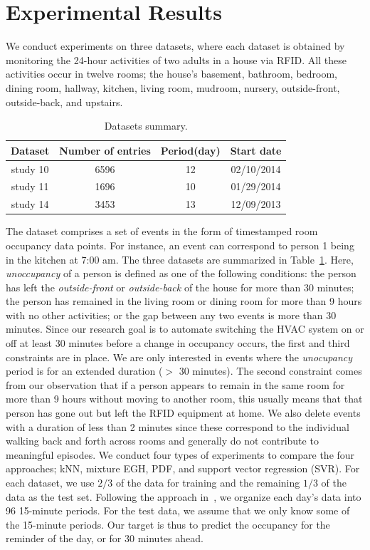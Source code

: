 \section{Experimental Results}
We conduct experiments on three datasets, where each dataset is obtained by monitoring the 24-hour activities of two adults in a house via RFID. 
All these activities occur in twelve rooms; the house's basement, bathroom, bedroom, dining room, hallway, kitchen, living room, mudroom, nursery, outside-front, outside-back, and upstairs.  
\begin{table}[h]
\caption{Datasets summary.} 
\label{tab_dataset}
\centering
\begin{tabular} {|c|c|c|c|}
\hline
Dataset & Number of entries & Period(day) & Start date\\
\hline
study 10  & 6596 & 12 & 02/10/2014\\
\hline
study 11  & 1696 & 10 & 01/29/2014\\
\hline
study 14 & 3453 & 13 & 12/09/2013\\
\hline
\end{tabular}
\end{table}
The dataset comprises a set of events in the form of timestamped room occupancy data points. For instance, an event can correspond to person 1 being in the kitchen at 7:00 am. The three datasets are summarized in Table~\ref{tab_dataset}.
Here, \textit{unoccupancy} of a person is defined as one of the following conditions: the person has left the {\em outside-front} or {\em outside-back} of the house for more than 30 minutes; the person has remained in the living room or dining room for more than 9 hours with no other activities; or the gap between any two events is more than 30 minutes. 
Since our research goal is to automate switching the HVAC system on or off at least 30 minutes before a change in occupancy occurs, the first and third constraints are in place. We are only interested in events where the {\em unocupancy} period is for an extended duration ($>$ 30 minutes). The second constraint comes from our observation that if a person appears to remain in the same room for more than 9 hours without moving to another room, 
this usually means that that person has gone out but left the RFID equipment at home. 
We also delete events with a duration of less than 
2 minutes since these correspond to the individual walking back and forth across rooms and generally do not contribute to meaningful episodes. We conduct four types of experiments to compare the four approaches; 
kNN, mixture EGH, PDF, and support vector regression (SVR). 
For each dataset, we use $2/3$ of the data for training and the remaining $1/3$ of the data as the test set. 
Following the approach in~\cite{scott2011preheat},
we organize each day's data into 96 15-minute periods. 
For the test data, we assume that we only know some of the 15-minute periods. Our target is thus to predict the occupancy for the reminder of the day, or for 30 minutes ahead. 

